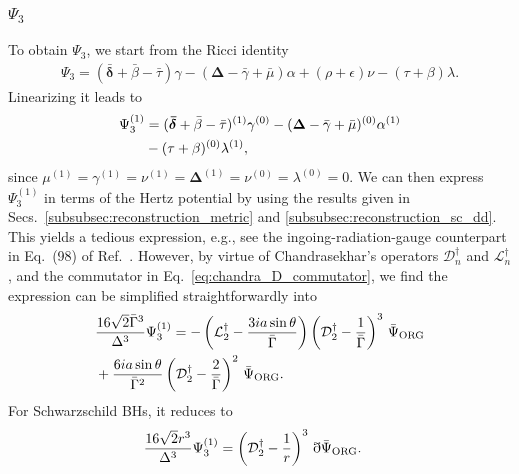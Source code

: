 \documentclass[aps,prd,amsmath,floats,floatfix, twocolumn,
superscriptaddress,nofootinbib,showpacs]{revtex4-1}
\newcommand{\hertzbar}{\bar{\Psi}_{\rm ORG}}
\begin{document}
\subsubsection{\texorpdfstring{$\Psi_3$}{Psi3}}
To obtain $\Psi_3$, we start from the Ricci identity \cite{chandrasekhar1998mathematical}
\begin{align}
    \Psi_3=(\bm{\bar{\delta}}+\bar{\beta}-\bar{\tau})\gamma-(\bm{\Delta}-\bar{\gamma}+\bar{\mu})\alpha+(\rho+\epsilon)\nu-(\tau+\beta)\lambda.
\end{align}
Linearizing it leads to
\begin{align}
    \Psi_3^{(1)}&=(\bm{\bar{\delta}}+\bar{\beta}-\bar{\tau})^{(1)}\gamma^{(0)}-(\bm{\Delta}-\bar{\gamma}+\bar{\mu})^{(0)}\alpha^{(1)} \notag \\
    &-(\tau+\beta)^{(0)}\lambda^{(1)},
\end{align}
since  $\mu^{(1)}=\gamma^{(1)}=\nu^{(1)}=\bm{\Delta}^{(1)}=\nu^{(0)}=\lambda^{(0)}=0$. We can then express $\Psi_3^{(1)}$ in terms of the Hertz potential by using the results given in Secs.~\ref{subsubsec:reconstruction_metric} and \ref{subsubsec:reconstruction_sc_dd}. This yields a tedious expression, e.g., see the ingoing-radiation-gauge counterpart in Eq.~(98) of Ref.~\cite{Keidl:2006wk}. However, by virtue of Chandrasekhar's operators $\mathcal{D}_n^\dagger$ and $\mathcal{L}_n^\dagger$, and the commutator in Eq.~\eqref{eq:chandra_D_commutator}, we find the expression can be simplified straightforwardly into
\begin{align}
 &\frac{16\sqrt{2}\bar{\Gamma}^3}{\Delta^3}\Psi_3^{(1)} 
=-\left(\mathcal{L}_2^\dagger-\frac{3ia\sin\theta}{\bar{\Gamma}}\right)\left(\mathcal{D}^\dagger_2-\frac{1}{\bar{\Gamma}} \right)^3\,\hertzbar \notag \\
&+\frac{6ia\sin\theta}{\bar{\Gamma}^2}\left(\mathcal{D}^\dagger_2-\frac{2}{\bar{\Gamma}} \right)^2\,\hertzbar.
\end{align}
For Schwarzschild BHs, it reduces to
\begin{align}
 &\frac{16\sqrt{2}r^3}{\Delta^3}\Psi_3^{(1)} 
=\left(\mathcal{D}^\dagger_2-\frac{1}{r} \right)^3\,\eth\hertzbar.
\end{align}
\end{document}
